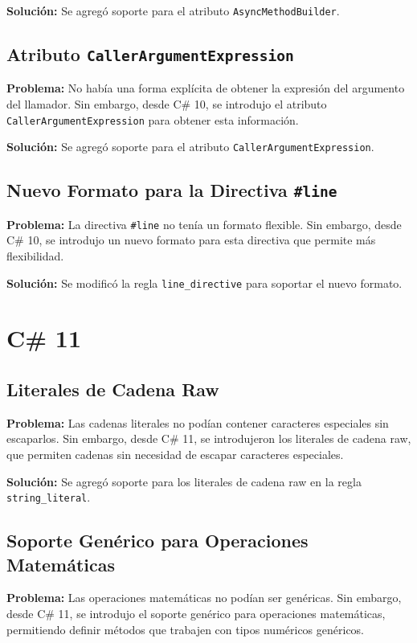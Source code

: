 \textbf{Solución:} Se agregó soporte para el atributo \texttt{AsyncMethodBuilder}.

\subsection*{Atributo \texttt{CallerArgumentExpression}}
\textbf{Problema:} No había una forma explícita de obtener la expresión del argumento del llamador. Sin embargo, desde C\# 10, se introdujo el atributo \texttt{CallerArgumentExpression} para obtener esta información.

\textbf{Solución:} Se agregó soporte para el atributo \texttt{CallerArgumentExpression}.

\subsection*{Nuevo Formato para la Directiva \texttt{\#line}}
\textbf{Problema:} La directiva \texttt{\#line} no tenía un formato flexible. Sin embargo, desde C\# 10, se introdujo un nuevo formato para esta directiva que permite más flexibilidad.

\textbf{Solución:} Se modificó la regla \texttt{line\_directive} para soportar el nuevo formato.


\section{C\# 11}

\subsection*{Literales de Cadena Raw}

\textbf{Problema:} Las cadenas literales no podían contener caracteres especiales sin escaparlos. Sin embargo, desde C\# 11, se introdujeron los literales de cadena raw, que permiten cadenas sin necesidad de escapar caracteres especiales.

\textbf{Solución:} Se agregó soporte para los literales de cadena raw en la regla \texttt{string\_literal}.

\subsection*{Soporte Genérico para Operaciones Matemáticas}

\textbf{Problema:} Las operaciones matemáticas no podían ser genéricas. Sin embargo, desde C\# 11, se introdujo el soporte genérico para operaciones matemáticas, permitiendo definir métodos que trabajen con tipos numéricos genéricos.

